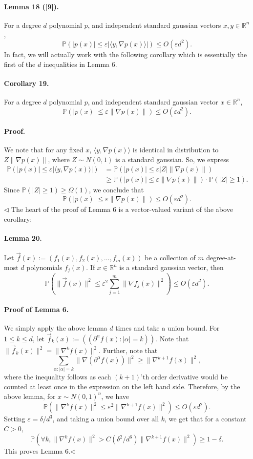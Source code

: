 \paragraph{Lemma 18 ([9]).} For a degree $d$ polynomial $p$, and independent standard gaussian vectors $x,y\in\mathbb R^n$,
\[\mathbb P(|p(x)|\leq\varepsilon|\langle y,\nabla p(x)\rangle|)\leq O(\varepsilon d^2).\]
In fact, we will actually work with the following corollary which is essentially the first of the $d$ inequalities in Lemma 6.
\paragraph{Corollary 19.} For a degree $d$ polynomial $p$, and independent standard gaussian vector $x\in\mathbb R^n$,
\[\mathbb P(|p(x)|\leq\varepsilon\|\nabla p(x)\|)\leq O(\varepsilon d^2).\]
\paragraph{Proof.} We note that for any fixed $x$, $\langle y,\nabla p(x)\rangle$ is identical in distribution to $Z\|\nabla p(x)\|$, where $Z\sim N(0,1)$ is a standard gaussian. So, we express
\begin{align*}
\mathbb P(|p(x)|\leq\varepsilon|\langle y,\nabla p(x)\rangle|)&=\mathbb P(|p(x)|\leq\varepsilon|Z|\|\nabla p(x)\|)\\
&\geq\mathbb P(|p(x)|\leq\varepsilon\|\nabla p(x)\|)\cdot\mathbb P(|Z|\geq1).
\end{align*}
Since $\mathbb P(|Z|\geq1)\geq\Omega(1)$, we conclude that
\[\mathbb P(|p(x)|\leq\varepsilon\|\nabla p(x)\|)\leq O(\varepsilon d^2).\]\hfill$\triangleleft$
The heart of the proof of Lemma 6 is a vector-valued variant of the above corollary:
\paragraph{Lemma 20.} Let $\vec f(x):=(f_1(x),f_2(x),\ldots,f_m(x))$ be a collection of $m$ degree-at-most $d$ polynomials $f_j(x)$. If $x\in\mathbb R^n$ is a standard gaussian vector, then
\[\mathbb P\left(\|\vec f(x)\|^2\leq\varepsilon^2\sum_{j=1}^m\|\nabla f_j(x)\|^2\right)\leq O(\varepsilon d^2).\]
\paragraph{Proof of Lemma 6.} We simply apply the above lemma $d$ times and take a union bound. For $1\leq k\leq d$, let $\vec f_k(x):=((\partial^\alpha f(x):|\alpha|=k))$. Note that $\|\vec f_k(x)\|^2=\|\nabla^kf(x)\|^2$. Further, note that
\[\sum_{\alpha:|\alpha|=k}\|\nabla(\partial^\alpha f(x))\|^2\geq\|\nabla^{k+1}f(x)\|^2,\]
where the inequality follows as each $(k+1)$'th order derivative would be counted at least once in the expression on the left hand side. Therefore, by the above lemma, for $x\sim N(0,1)^n$, we have
\[\mathbb P(\|\nabla^kf(x)\|^2\leq\varepsilon^2\|\nabla^{k+1}f(x)\|^2)\leq O(\varepsilon d^2).\]
Setting $\varepsilon=\delta/d^3$, and taking a union bound over all $k$, we get that for a constant $C>0$,
\[\mathbb P(\forall k,\|\nabla^kf(x)\|^2>C(\delta^2/d^6)\|\nabla^{k+1}f(x)\|^2)\geq1-\delta.\]
This proves Lemma 6.\hfill$\triangleleft$
